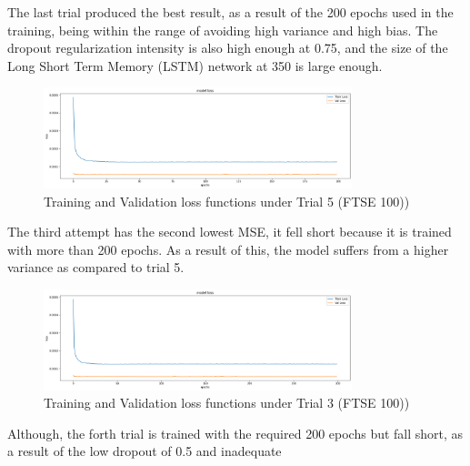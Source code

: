 \documentclass[a4paper,11pt,oneside]{book}
\begin{document}
The last trial produced the best result, as a result of the 200 epochs used in the training, being within the range
of avoiding high variance and high bias. The dropout regularization intensity is also high enough at 0.75,
and the size of the Long Short Term Memory (LSTM) network at 350 is large enough.
\begin{figure}[!h]
	\centering
	\includegraphics[width=0.8\textwidth]{figures/FTSE5}
	\caption{Training and Validation loss functions under Trial 5 (FTSE 100))}
	\label{FTSE5}
\end{figure}
\newline The third attempt has the second lowest MSE, it fell short because it is trained with more than 200 epochs. As a
result of this, the model suffers from a higher variance as compared to trial 5.\newline\newline\newline\newline\newline\newline\newline\newline\newline\newline\newline\newline
\begin{figure}[!h]
	\centering
	\includegraphics[width=0.8\textwidth]{figures/FTSE3}
	\caption{Training and Validation loss functions under Trial 3 (FTSE 100))}
	\label{FTSE3}
\end{figure}
\newline Although, the forth trial is trained with the required 200 epochs but fall short, as a result of the low dropout of 0.5 and inadequate
\end{document}
